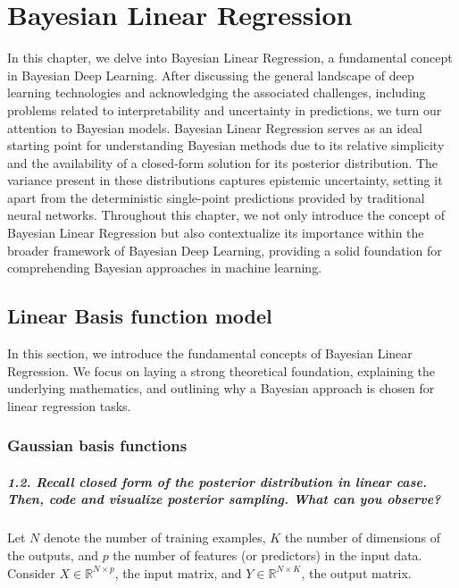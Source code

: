 \graphicspath{{figs/3a}}
\chapter{Bayesian Linear Regression}

In this chapter, we delve into Bayesian Linear Regression, a fundamental concept in Bayesian Deep Learning. After discussing the general landscape of deep learning technologies and acknowledging the associated challenges, including problems related to interpretability and uncertainty in predictions, we turn our attention to Bayesian models. Bayesian Linear Regression serves as an ideal starting point for understanding Bayesian methods due to its relative simplicity and the availability of a closed-form solution for its posterior distribution. The variance present in these distributions captures epistemic uncertainty, setting it apart from the deterministic single-point predictions provided by traditional neural networks. Throughout this chapter, we not only introduce the concept of Bayesian Linear Regression but also contextualize its importance within the broader framework of Bayesian Deep Learning, providing a solid foundation for comprehending Bayesian approaches in machine learning.

\section{Linear Basis function model}

In this section, we introduce the fundamental concepts of Bayesian Linear Regression. We focus on laying a strong theoretical foundation, explaining the underlying mathematics, and outlining why a Bayesian approach is chosen for linear regression tasks.

\subsection{Gaussian basis functions}
\paragraph*{1.2. Recall closed form of the posterior distribution in linear case. Then, code and visualize posterior sampling. What can you observe?}

Let $N$ denote the number of training examples, $K$ the number of dimensions of the outputs, and $p$ the number of features (or predictors) in the input data. Consider $X \in \mathbb{R}^{N \times p}$, the input matrix, and $Y \in \mathbb{R}^{N \times K}$, the output matrix. 

